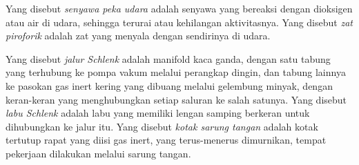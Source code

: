 \begin{definition}\label{def:b3:lab-techniques-3:air-sensitive}
Yang disebut \emph{senyawa peka udara} adalah senyawa yang bereaksi dengan
dioksigen atau air di udara, sehingga terurai atau kehilangan aktivitasnya. Yang disebut
\emph{zat piroforik} adalah zat yang menyala dengan sendirinya di
udara.
\end{definition}

\begin{definition}\label{def:b3:lab-techniques-3:schlenk}
Yang disebut \emph{jalur Schlenk} adalah manifold kaca ganda, dengan satu tabung
yang terhubung ke pompa vakum melalui perangkap dingin, dan tabung lainnya ke pasokan gas inert kering
yang dibuang melalui gelembung minyak, dengan keran-keran yang menghubungkan setiap saluran ke
salah satunya. Yang disebut \emph{labu Schlenk} adalah labu yang memiliki lengan samping berkeran
untuk dihubungkan ke jalur itu. Yang disebut \emph{kotak sarung tangan} adalah kotak tertutup rapat
yang diisi gas inert, yang terus-menerus dimurnikan, tempat pekerjaan dilakukan melalui
sarung tangan.
\end{definition}


